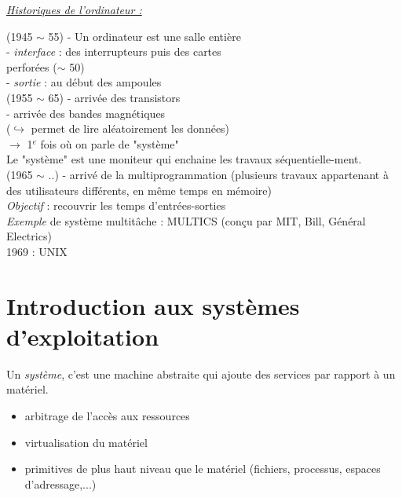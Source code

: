 \documentclass[12pt,a4paper]{report}
\begin{document}
\textit{\underline{Historiques de l'ordinateur :}}

 
(1945 $\sim$ 55) - Un ordinateur est une salle entière\\
\hspace*{2,8 cm} - \textit{interface} : des interrupteurs puis des cartes\\
\hspace*{2,9 cm}perforées ($\sim$ 50)\\
\hspace*{2,8 cm} - \textit{sortie} : au début des ampoules\\

(1955 $\sim$ 65) - arrivée des transistors\\
\hspace*{2,8 cm} - arrivée des bandes magnétiques\\
\hspace*{2,8 cm} ($\hookrightarrow$ permet de lire aléatoirement les données)\\
\hspace*{2,8 cm} $\rightarrow$ 1$^e$ fois où on parle de "système" \\
\hspace*{1cm} Le "système" est une moniteur qui enchaine les travaux séquentielle-ment.\\

(1965 $\sim$ ..) - arrivé de la multiprogrammation (plusieurs travaux appartenant à des utilisateurs différents, en même temps en mémoire)\\
\textit{Objectif} : recouvrir les temps d'entrées-sorties\\

\textit{Exemple} de système multitâche : MULTICS (conçu par MIT, Bill, Général Electrics)\\
\hspace*{2cm} 1969 : UNIX




\chapter{Introduction aux systèmes d'exploitation}
Un \textit{système}, c'est une machine abstraite qui ajoute des services par rapport à un matériel.
\begin{itemize}
\item arbitrage de l'accès aux ressources
\item virtualisation du matériel
\item primitives de plus haut niveau que le matériel (fichiers, processus, espaces d'adressage,...)
\end{itemize}
\end{document}
